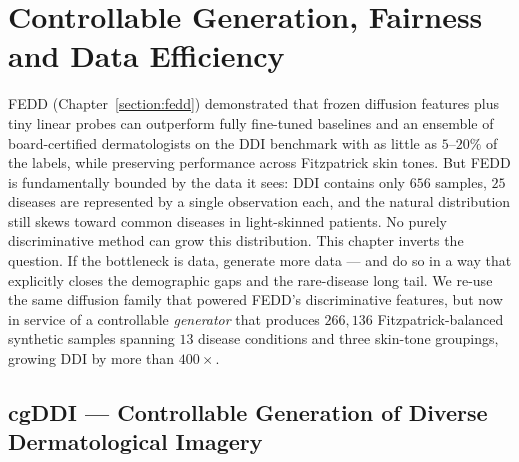 \documentclass[11pt]{ucthesis}
\begin{document}
\chapter{Controllable Generation, Fairness and Data Efficiency}\label{section:cgddi}

FEDD (Chapter~\ref{section:fedd}) demonstrated that frozen diffusion features plus tiny linear probes can outperform fully fine-tuned baselines and an ensemble of board-certified dermatologists on the DDI benchmark with as little as $5$--$20\%$ of the labels, while preserving performance across Fitzpatrick skin tones. But FEDD is fundamentally bounded by the data it sees: DDI contains only $656$ samples, $25$ diseases are represented by a single observation each, and the natural distribution still skews toward common diseases in light-skinned patients. No purely discriminative method can grow this distribution. This chapter inverts the question. If the bottleneck is data, generate more data --- and do so in a way that explicitly closes the demographic gaps and the rare-disease long tail. We re-use the same diffusion family that powered FEDD's discriminative features, but now in service of a controllable \emph{generator} that produces $266{,}136$ Fitzpatrick-balanced synthetic samples spanning $13$ disease conditions and three skin-tone groupings, growing DDI by more than $400\times$.

\section{cgDDI — Controllable Generation of Diverse Dermatological Imagery}\label{section:cgddi_abs}
\end{document}
